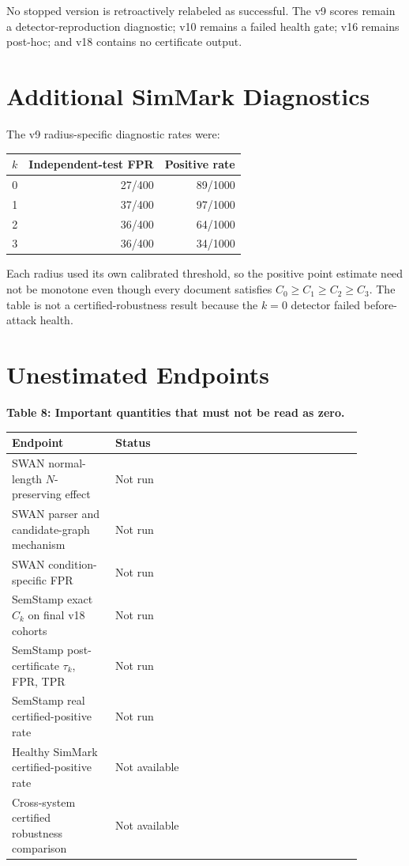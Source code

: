 \documentclass[10pt]{article}
\begin{document}
No stopped version is retroactively relabeled as successful. The v9 scores
remain a detector-reproduction diagnostic; v10 remains a failed health gate;
v16 remains post-hoc; and v18 contains no certificate output.

\section{Additional SimMark Diagnostics}

The v9 radius-specific diagnostic rates were:

\begin{center}
\begin{tabular}{rrr}
\toprule
$k$ & Independent-test FPR & Positive rate \\
\midrule
0 & 27/400 & 89/1000 \\
1 & 37/400 & 97/1000 \\
2 & 36/400 & 64/1000 \\
3 & 36/400 & 34/1000 \\
\bottomrule
\end{tabular}
\end{center}

Each radius used its own calibrated threshold, so the positive point estimate
need not be monotone even though every document satisfies
$C_0\geq C_1\geq C_2\geq C_3$. The table is not a certified-robustness result
because the $k=0$ detector failed before-attack health.

\clearpage
\section{Unestimated Endpoints}

\begin{center}
\textbf{Table 8: Important quantities that must not be read as zero.}

\centering
\small
\begin{tabular}{p{0.26\linewidth}p{0.62\linewidth}}
\toprule
Endpoint & Status \\
\midrule
SWAN normal-length $N$-preserving effect & Not run \\
SWAN parser and candidate-graph mechanism & Not run \\
SWAN condition-specific FPR & Not run \\
SemStamp exact $C_k$ on final v18 cohorts & Not run \\
SemStamp post-certificate $\tau_k$, FPR, TPR & Not run \\
SemStamp real certified-positive rate & Not run \\
Healthy SimMark certified-positive rate & Not available \\
Cross-system certified robustness comparison & Not available \\
\bottomrule
\end{tabular}
\end{center}
\end{document}
